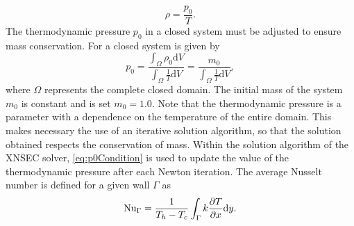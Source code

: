 \begin{equation}
	\rho = \frac{p_0}{T}.
\end{equation}
The thermodynamic pressure $p_0$ in a closed system must be adjusted to ensure mass conservation. For a closed system is given by
\begin{equation}
	p_0 =\frac{\int_\Omega \rho_0\text{d}V}{\int_\Omega \frac{1}{T}\text{d}V}= \frac{m_0}{\int_\Omega \frac{1}{T}\text{d}V}, \label{eq:p0Condition}
\end{equation}
where $\Omega$ represents the complete closed domain. The initial mass of the system $m_0$ is constant and is set $m_0 = 1.0$. Note that the thermodynamic pressure is a parameter with a dependence on the temperature of the entire domain. This makes necessary the use of an iterative solution algorithm, so that the solution obtained respects the conservation of mass. Within the solution algorithm of the XNSEC solver, \cref{eq:p0Condition} is used to update the value of the thermodynamic pressure after each Newton iteration.
The average Nusselt number is defined for a given wall $\Gamma$  as
\begin{equation}\label{eq:Nusselt}
	\text{Nu}_\Gamma = \frac{1}{T_h - T_c}\int_{\Gamma} k \frac{\partial T}{\partial x}\text{d}y.
\end{equation}

